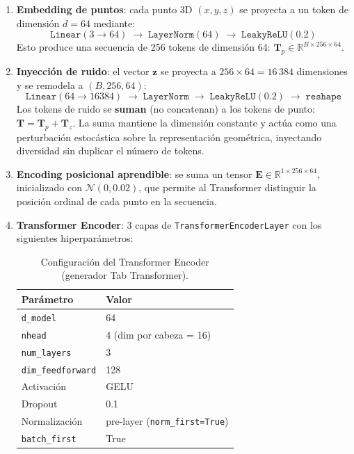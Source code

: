\documentclass[a4paper,11pt]{article}
\begin{document}
\begin{enumerate}
    \item \textbf{Embedding de puntos}: cada punto 3D $(x,y,z)$ se proyecta
          a un token de dimensión $d=64$ mediante:
          \[
            \texttt{Linear}(3 \to 64) \;\to\; \texttt{LayerNorm}(64)
            \;\to\; \texttt{LeakyReLU}(0.2)
          \]
          Esto produce una secuencia de 256 tokens de dimensión 64:
          $\bm{T}_p \in \mathbb{R}^{B \times 256 \times 64}$.

    \item \textbf{Inyección de ruido}: el vector $\bm{z}$ se proyecta
          a $256 \times 64 = 16\,384$ dimensiones y se remodela a
          $(B, 256, 64)$:
          \[
            \texttt{Linear}(64 \to 16384) \;\to\; \texttt{LayerNorm}
            \;\to\; \texttt{LeakyReLU}(0.2) \;\to\; \texttt{reshape}
          \]
          Los tokens de ruido se \textbf{suman} (no concatenan) a los tokens
          de punto: $\bm{T} = \bm{T}_p + \bm{T}_z$. La suma mantiene la
          dimensión constante y actúa como una perturbación estocástica sobre
          la representación geométrica, inyectando diversidad sin duplicar
          el número de tokens.

    \item \textbf{Encoding posicional aprendible}: se suma un tensor
          $\bm{E} \in \mathbb{R}^{1 \times 256 \times 64}$, inicializado
          con $\mathcal{N}(0, 0.02)$, que permite al Transformer distinguir
          la posición ordinal de cada punto en la secuencia.

    \item \textbf{Transformer Encoder}: 3 capas de
          \texttt{TransformerEncoderLayer} con los siguientes hiperparámetros:

          \begin{table}[H]
              \centering
              \caption{Configuración del Transformer Encoder
                       (generador Tab Transformer).}
              \label{tab:tabgen_transformer}
              \begin{tabular}{@{}ll@{}}
                  \toprule
                  \textbf{Parámetro} & \textbf{Valor} \\
                  \midrule
                  \texttt{d\_model}         & 64 \\
                  \texttt{nhead}            & 4 (dim por cabeza = 16) \\
                  \texttt{num\_layers}      & 3 \\
                  \texttt{dim\_feedforward}  & 128 \\
                  Activación               & GELU \\
                  Dropout                  & 0.1 \\
                  Normalización            & pre-layer (\texttt{norm\_first=True}) \\
                  \texttt{batch\_first}     & True \\
                  \bottomrule
              \end{tabular}
          \end{table}


\end{enumerate}
\end{document}
